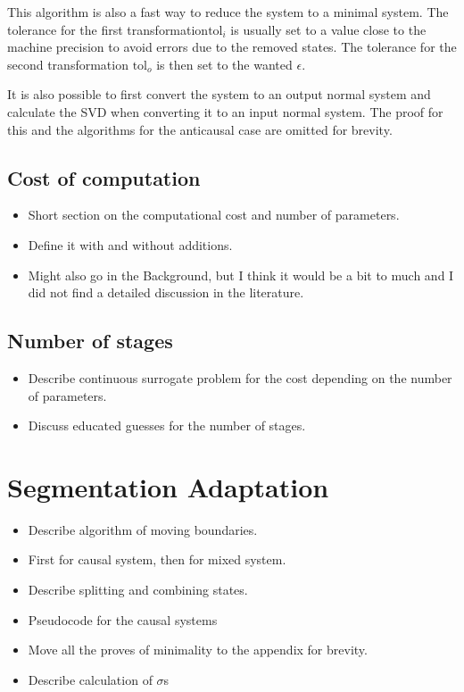\documentclass[doctype=mastersthesis,BCOR=15mm,biblatex]{ldvbook}%
\begin{document}
\begin{itemize}
This algorithm is also a fast way to reduce the system to a minimal system.
The tolerance for the first transformation$\text{tol}_i$ is usually set to a value close to the machine precision to avoid errors due to the removed states.
The tolerance for the second transformation $\text{tol}_o$ is then set to the wanted $\epsilon$.
 
It is also possible to first convert the system to an output normal system and calculate the SVD when converting it to an input normal system.
The proof for this and the algorithms for the anticausal case are omitted for brevity.

 
 

\end{itemize}
\subsection{Cost of computation}
\begin{itemize}
\item Short section on the computational cost and number of parameters.

\item Define it with and without additions.

\item Might also go in the Background, but I think it would be a bit to much and I did not find a detailed discussion in the literature. 
\end{itemize}
\subsection{Number of stages}
\begin{itemize}
\item Describe continuous surrogate problem for the cost depending on the number of parameters. 
\item Discuss educated guesses for the number of stages.
\end{itemize}

\section{Segmentation Adaptation}
\begin{itemize}
\item Describe algorithm of moving boundaries.
\item First for causal system, then for mixed system.

\item Describe splitting and combining states.

\item Pseudocode for the causal systems

\item Move all the proves of minimality to the appendix for brevity.
\item Describe calculation of $\sigma$s
\end{itemize}
\end{document}
